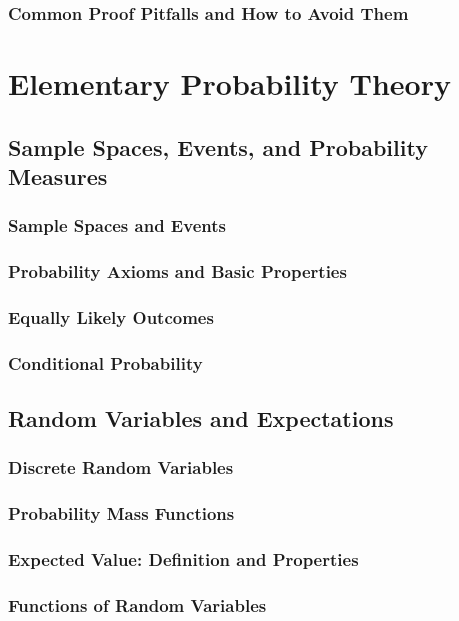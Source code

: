 \subsubsection{Common Proof Pitfalls and How to Avoid Them}

\section{Elementary Probability Theory}
\subsection{Sample Spaces, Events, and Probability Measures}
\subsubsection{Sample Spaces and Events}
\subsubsection{Probability Axioms and Basic Properties}
\subsubsection{Equally Likely Outcomes}
\subsubsection{Conditional Probability}

\subsection{Random Variables and Expectations}
\subsubsection{Discrete Random Variables}
\subsubsection{Probability Mass Functions}
\subsubsection{Expected Value: Definition and Properties}
\subsubsection{Functions of Random Variables}

